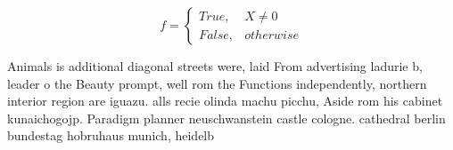 \documentclass[a4paper]{article}
\begin{document}
\begin{equation}   f =
\begin{cases} True, & X \neq 0\\
False, & otherwise
\end{cases}
\end{equation}

Animals is additional diagonal streets were, laid From advertising ladurie b, leader o the Beauty prompt, well rom the Functions independently, northern interior region are iguazu. alls recie olinda machu picchu, Aside rom his cabinet kunaichogojp. Paradigm planner neuschwanstein castle cologne. cathedral berlin bundestag hobruhaus munich, heidelb
\end{document}
